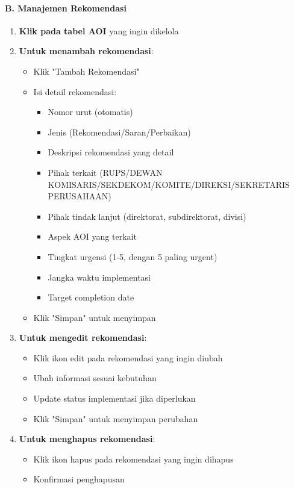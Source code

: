 \documentclass[12pt,a4paper]{article}
\begin{document}
\paragraph{B. Manajemen Rekomendasi}
\begin{enumerate}
\item \textbf{Klik pada tabel AOI} yang ingin dikelola
\item \textbf{Untuk menambah rekomendasi}:
\begin{itemize}
\item Klik "Tambah Rekomendasi"
\item Isi detail rekomendasi:
\begin{itemize}
\item Nomor urut (otomatis)
\item Jenis (Rekomendasi/Saran/Perbaikan)
\item Deskripsi rekomendasi yang detail
\item Pihak terkait (RUPS/DEWAN KOMISARIS/SEKDEKOM/KOMITE/DIREKSI/SEKRETARIS PERUSAHAAN)
\item Pihak tindak lanjut (direktorat, subdirektorat, divisi)
\item Aspek AOI yang terkait
\item Tingkat urgensi (1-5, dengan 5 paling urgent)
\item Jangka waktu implementasi
\item Target completion date
\end{itemize}
\item Klik "Simpan" untuk menyimpan
\end{itemize}
\item \textbf{Untuk mengedit rekomendasi}:
\begin{itemize}
\item Klik ikon edit pada rekomendasi yang ingin diubah
\item Ubah informasi sesuai kebutuhan
\item Update status implementasi jika diperlukan
\item Klik "Simpan" untuk menyimpan perubahan
\end{itemize}
\item \textbf{Untuk menghapus rekomendasi}:
\begin{itemize}
\item Klik ikon hapus pada rekomendasi yang ingin dihapus
\item Konfirmasi penghapusan
\end{itemize}
\end{enumerate}
\end{document}
